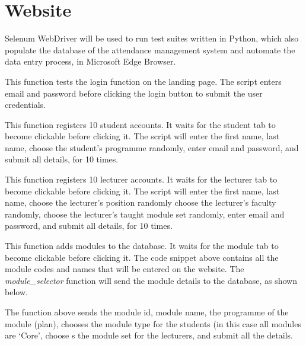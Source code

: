 \documentclass[../report.tex]{subfiles}
\begin{document}
\section{Website}
Selenum WebDriver will be used to run test suites written in Python, which also populate the database of the attendance management system and automate the data entry process, in Microsoft Edge Browser.



This function tests the login function on the landing page. The script enters email and password before clicking the login button to submit the user credentials.



This function registers 10 student accounts. It waits for the student tab to become clickable before clicking it. The script will enter the first name, last name, choose the student’s programme randomly, enter email and password, and submit all details, for 10 times.



This function registers 10 lecturer accounts. It waits for the lecturer tab to become clickable before clicking it. The script will enter the first name, last name, choose the lecturer’s position randomly choose the lecturer’s faculty randomly, choose the lecturer’s taught module set randomly, enter email and password, and submit all details, for 10 times.



This function adds modules to the database. It waits for the module tab to become clickable before clicking it. The code snippet above contains all the module codes and names that will be entered on the website. The \textit{module\_selector} function will send the module details to the database, as shown below.



The function above sends the module id, module name, the programme of the module (plan), chooses the module type for the students (in this case all modules are `Core', choose s the module set for the lecturers, and submit all the details. 


\end{document}
